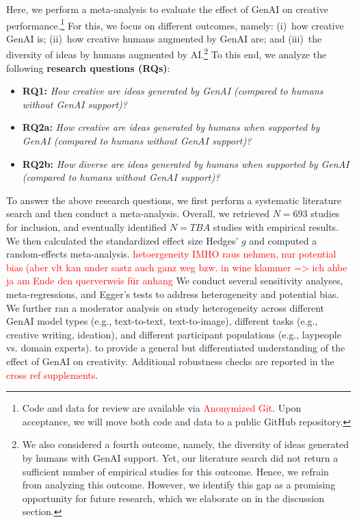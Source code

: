 \documentclass[manuscript, screen, review, acmsmall, anonymous]{acmart}
\newcommand{\TODO}[1]{\textcolor{red}{#1}}
\begin{document}
Here, we perform a meta-analysis to evaluate the effect of GenAI on creative performance.\footnote{Code and data for review are available via \TODO{Anonymized Git}. Upon acceptance, we will move both code and data to a public GitHub repository.} For this, we focus on different outcomes, namely: (i)~how creative GenAI is; (ii)~how creative humans augmented by GenAI are; and (iii)~the diversity of ideas by humans augmented by AI.\footnote{We also considered a fourth outcome, namely, the diversity of ideas generated by humans with GenAI support. Yet, our literature search did not return a sufficient number of empirical studies for this outcome. Hence, we refrain from analyzing this outcome. However, we identify this gap as a promising opportunity for future research, which we elaborate on in the discussion section.} To this end, we analyze the following \textbf{research questions (RQs)}:

\begin{itemize}
\item \textbf{RQ1:} \textit{How creative are ideas generated by GenAI (compared to humans without GenAI support)?}
\item \textbf{RQ2a:} \textit{How creative are ideas generated by humans when supported by GenAI (compared to humans without GenAI support)?}
\item \textbf{RQ2b:} \textit{How diverse are ideas generated by humans when supported by GenAI (compared to humans without GenAI support)?}
\end{itemize}

\noindent
To answer the above research questions, we first perform a systematic literature search and then conduct a meta-analysis. Overall, we retrieved $N= 693$ studies for inclusion, and eventually identified $N = TBA$ studies with empirical results. We then calculated the standardized effect size Hedges' $g$ and computed a random-effects meta-analysis. \TODO{hetoergeneity IMHO raus nehmen, nur potential bias (aber vlt kan under sastz auch ganz weg bzw. in wine klammer => ich ahbe ja am Ende den querverweis für anhang }We conduct several sensitivity analyses, meta-regressions, and Egger's tests to address heterogeneity and potential bias. We further ran a moderator analysis on study heterogeneity across different GenAI model types (e.g., text-to-text, text-to-image), different tasks (e.g., creative writing, ideation), and different participant populations (e.g., laypeople vs. domain experts). to provide a general but differentiated understanding of the effect of GenAI on creativity. Additional robustness checks are reported in the \TODO{cross ref supplements}.
\end{document}
